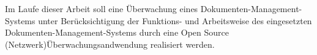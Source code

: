 Im Laufe dieser Arbeit soll eine Überwachung eines Dokumenten-Management-Systems unter Berücksichtigung der Funktions- und Arbeitsweise des eingesetzten Dokumenten-Management-Systems durch eine Open Source (Netzwerk)Überwachungsandwendung realisiert werden.
 

